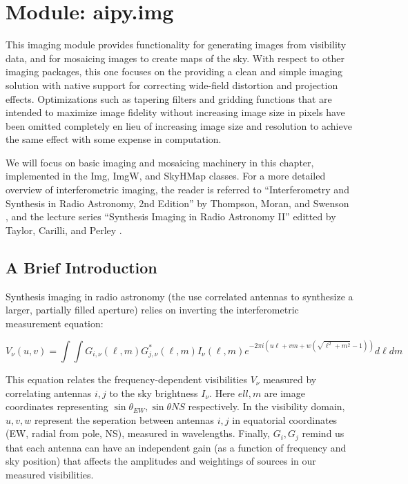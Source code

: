 \section{Module: aipy.img}
\label{sec:img}

This imaging module provides functionality for generating images from
visibility data, and for mosaicing images to create maps of the sky.  With
respect to other imaging packages, this one focuses on the providing a
clean and simple imaging solution with native support for correcting
wide-field distortion and projection effects.  Optimizations
such as tapering filters and gridding functions that are intended to
maximize image fidelity without increasing image size in pixels have been
omitted completely en lieu of increasing image size and resolution
to achieve the same effect with some expense in computation.

We will focus on basic imaging and mosaicing machinery in this chapter,
implemented in the Img, ImgW, and SkyHMap classes.  For a more detailed
overview of interferometric imaging, the reader is referred to
``Interferometry and Synthesis in Radio Astronomy, 2nd Edition'' by 
Thompson, Moran, and Swenson \cite{thompson_et_al2001}, and the lecture 
series ``Synthesis Imaging in Radio Astronomy II'' editted by Taylor, Carilli,
and Perley \cite{taylor_et_al1999}.

\subsection{A Brief Introduction}
\label{sec:img_intro}

Synthesis imaging in radio astronomy (the use correlated antennas to 
synthesize a larger, partially filled aperture) relies on inverting
the interferometric measurement equation:

\begin{equation}
V_{\nu}(u,v)=\int\!\!\!\!\int{G_{i,\nu}(\ell,m)G_{j,\nu}^*(\ell,m)
I_\nu(\ell,m)}
{e^{-2\pi i(u\ell+vm+w(\sqrt{\ell^2+m^2}-1))}d\ell dm}
\label{eq:meas_eq}
\end{equation}

This equation relates the frequency-dependent visibilities $V_\nu$ measured by
correlating antennas $i,j$ to the sky brightness $I_\nu$.  Here $ell,m$ are
image coordinates representing $\sin\theta_{EW},\sin\theta{NS}$
respectively.  In the visibility domain, $u,v,w$ represent the seperation
between antennas $i,j$ in equatorial coordinates (EW, radial from pole, NS),
measured in wavelengths. Finally, $G_i, G_j$ remind us that each antenna
can have an independent gain (as a function of frequency and sky position)
that affects the amplitudes and weightings of sources in our measured
visibilities.


